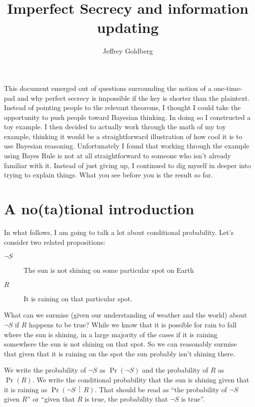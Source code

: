 \documentclass[11pt]{article}
\title{Imperfect Secrecy and information updating}
\author{Jeffrey Goldberg}
\newcommand{\prob}[1]{\ensuremath{\operatorname{Pr}\left( #1 \right)}}
\newcommand{\condprob}[2]{\prob{#1\, \middle|\, #2}}
\begin{document}
\maketitle

This document emerged out of questions surrounding the notion of a one-time-pad and why perfect secrecy is impossible if the key is shorter than the plaintext.
Instead of pointing people to the relevant theorems, I thought I could take the opportunity to push people toward Bayesian thinking.
In doing so I constructed a toy example. I then decided to actually work through the math of my toy example, thinking it would be a straightforward illustration of how cool it is to use Bayesian reasoning.
Unfortunately I found that working through the example using Bayes Rule is not at all straightforward to someone who isn't already familiar with it.
Instead of just giving up, I continued to dig myself in deeper into trying to explain things. What you see before you is the result so far.

\section{A no(ta)tional introduction}

In what follows, I am going to talk a lot about conditional probability.
Let's consider two related propositions:

\begin{description}
    \item[$\neg S$] The sun is not shining on some particular spot on Earth
    \item[$R$] It is raining on that particular spot.  
\end{description}

What can we surmise (given our understanding of weather and the world) about $\neg S$ if $R$ happens to be true? While we know that it is possible for rain to fall where the sun is shining, in a large majority of the cases if it is raining somewhere the sun is not shining on that spot. So we can reasonably surmise that given that it is raining on the spot the sun probably isn't shining there.

We write the probability of $\neg S$ as \prob{\neg S} and the probability of $R$ as \prob{R}. We write the conditional probability that the sun is shining given that it is raining as \condprob{\neg S}{R}.
That should be read as
\enquote{the probability of $\neg S$ given $R$}
or \enquote{given that $R$ is true, the probability that $\neg S$ is true}.
\end{document}

